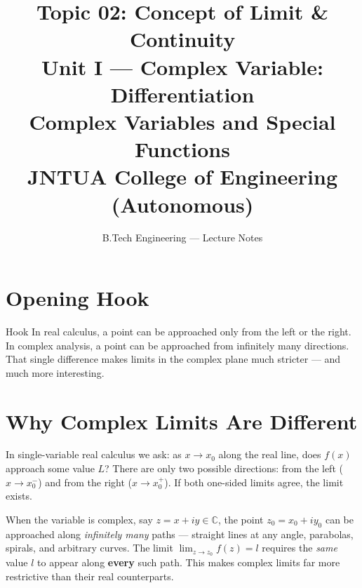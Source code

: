 \documentclass[12pt,a4paper]{article}
\title{\textbf{Topic 02: Concept of Limit \& Continuity}\\[0.5em]
\large Unit I --- Complex Variable: Differentiation\\[0.3em]
\normalsize Complex Variables and Special Functions\\
JNTUA College of Engineering (Autonomous)}
\author{B.Tech Engineering --- Lecture Notes}
\date{}
\begin{document}
\maketitle
\tableofcontents
\newpage

\section*{Opening Hook}

\begin{curiositybox}{Hook}
In real calculus, a point can be approached only from the left or the right.
In complex analysis, a point can be approached from infinitely many directions.
That single difference makes limits in the complex plane much stricter --- and much more interesting.
\end{curiositybox}

\section{Why Complex Limits Are Different}

In single-variable real calculus we ask: as $x \to x_0$ along the real line, does
$f(x)$ approach some value $L$?  There are only two possible directions: from the left
($x \to x_0^{-}$) and from the right ($x \to x_0^{+}$).  If both one-sided limits agree,
the limit exists.

When the variable is complex, say $z = x + iy \in \mathbb{C}$, the point $z_0 = x_0 + iy_0$
can be approached along \emph{infinitely many} paths --- straight lines at any angle,
parabolas, spirals, and arbitrary curves.  The limit $\lim_{z \to z_0} f(z) = l$
requires the \emph{same} value $l$ to appear along \textbf{every} such path.
This makes complex limits far more restrictive than their real counterparts.
\end{document}
